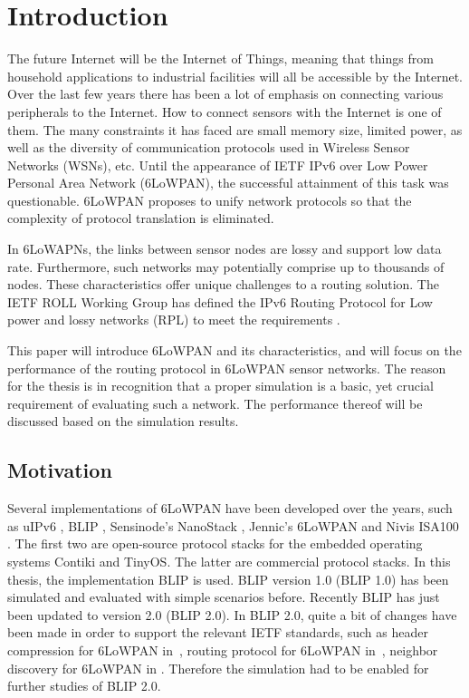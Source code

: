 \chapter{Introduction}
\label{1.0 Intr}

The future Internet will be the Internet of Things, meaning that things from household
applications to industrial facilities will all be accessible by the Internet. Over the last few years there has been a lot of emphasis on connecting various peripherals to the Internet. How to connect sensors with the Internet is one of them. The many constraints it has faced are small memory size, limited power,  as well as the diversity of communication protocols used in Wireless Sensor Networks (WSNs)\@, etc. Until the appearance of IETF IPv6 over Low Power Personal Area Network (6LoWPAN)\@, the successful attainment of this task was questionable. 6LoWPAN proposes to unify network protocols so that the complexity of protocol translation is eliminated. 
\newline

In 6LoWAPNs, the links between sensor nodes are lossy and support low data rate. Furthermore, such networks may potentially comprise up to thousands of nodes. These characteristics offer unique challenges to a routing solution. The IETF ROLL Working Group has defined the IPv6 Routing Protocol for Low power and lossy networks (RPL) to meet the requirements \cite{draft-ietf-roll-rpl-19}.
\newline

This paper will introduce 6LoWPAN and its characteristics, and will focus on the performance of the routing protocol in 6LoWPAN sensor networks. The reason for the thesis is in recognition that a proper simulation is a basic, yet crucial requirement of evaluating such a network. The performance thereof will be discussed based on the simulation results.

\section{Motivation}
\label{Intr:Motiv}

Several implementations of 6LoWPAN have been developed over the years, such as uIPv6 \cite{uIPv6}, BLIP \cite{BLIP}, Sensinode's NanoStack \cite{Sensinode}, Jennic's 6LoWPAN \cite{Jennic} and Nivis ISA100 \cite{Nivis}. The first two are open-source protocol stacks for the embedded operating systems Contiki and TinyOS. The latter are commercial protocol stacks. In this thesis, the implementation BLIP is used. BLIP version 1.0 (BLIP 1.0) has been simulated and evaluated with simple scenarios before. Recently BLIP has just been updated to version 2.0 (BLIP 2.0)\@. In BLIP 2.0, quite a bit of changes have been made in order to support the relevant IETF standards, such as header compression for 6LoWPAN in~\cite{draft-ietf-6lowpan-hc-15}, routing protocol for 6LoWPAN in~\cite{draft-ietf-roll-rpl-19}, neighbor discovery for 6LoWPAN in \cite{draft-ietf-6lowpan-nd-15}. 
Therefore the simulation had to be enabled for further studies of BLIP 2.0. 
\newline

